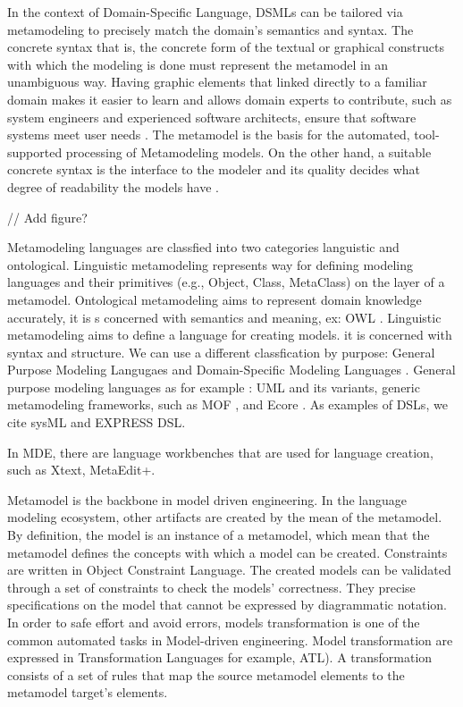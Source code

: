 In the context of Domain-Specific Language, DSMLs can be tailored via metamodeling to precisely match the domain's semantics and syntax. The concrete syntax that is, the concrete form of the textual or graphical constructs with which the modeling is done must represent the metamodel in an unambiguous way. Having graphic elements that linked directly to a familiar domain makes it easier to learn and allows domain  experts to contribute, such as system engineers and experienced software architects, ensure that software systems meet user needs \cite{volter2013model}. The metamodel is the basis for the automated, tool-supported processing of Metamodeling models. On the other hand, a suitable concrete syntax is the interface to the modeler and its quality decides what degree of readability the models have \cite{}.



// Add figure?

Metamodeling languages are classfied into two categories languistic and ontological\cite{gavsevic2007metamodeling}. Linguistic metamodeling represents  way for defining modeling languages and their primitives (e.g., Object, Class, MetaClass) on the layer of a metamodel. Ontological metamodeling aims to represent domain knowledge accurately, it is s concerned with semantics and meaning, ex: OWL \cite{}. Linguistic metamodeling aims to define a language for creating models. it is concerned with syntax and structure.
We can use a different classfication by purpose: General Purpose Modeling Langugaes and Domain-Specific Modeling Languages \cite{de2012domain}. General purpose modeling languages as for example : UML and its variants, generic metamodeling frameworks, such as MOF \cite{}, and Ecore \cite{}. As examples of DSLs, we cite sysML and EXPRESS DSL.

In MDE, there are language workbenches that are used for language creation, such as Xtext, MetaEdit+.



Metamodel is the backbone in model driven engineering. In the language modeling ecosystem, other artifacts are created by the mean of the metamodel. By definition, the model is an instance of a metamodel, which mean that the metamodel defines the concepts with which a model can be created. Constraints are written in Object Constraint Language. The created models can be validated through a set of constraints to check the models' correctness. They precise specifications on the model that cannot be  expressed by diagrammatic notation. In order to safe effort and avoid errors, models transformation is one of the common automated tasks in Model-driven engineering. Model transformation are expressed in  Transformation Languages for example, ATL). A transformation consists of a set of rules that map the source metamodel elements to the metamodel target’s elements. 

